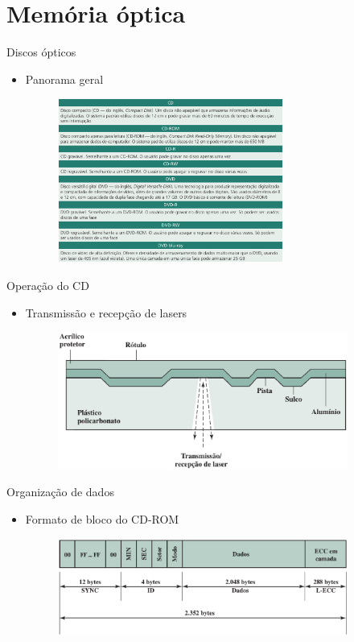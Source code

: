 \section[slide=true]{Memória óptica}
\begin{slide}{Discos ópticos}
	\begin{itemize}
		\item Panorama geral
			\begin{figure}
				\includegraphics[width = 0.7\textwidth]{figs/dopticos}
			\end{figure}
	\end{itemize}
\end{slide}
\begin{slide}{Operação do CD}
	\begin{itemize}
		\item Transmissão e recepção de lasers
			\begin{figure}
				\includegraphics[width = 0.9\textwidth]{figs/opt-cd}
			\end{figure}
	\end{itemize}
\end{slide}
\begin{slide}{Organização de dados}
	\begin{itemize}
		\item Formato de bloco do CD-ROM
			\begin{figure}
				\includegraphics[width = 0.9\textwidth]{figs/opt-cd-bloco}
			\end{figure}
	\end{itemize}
\end{slide}
